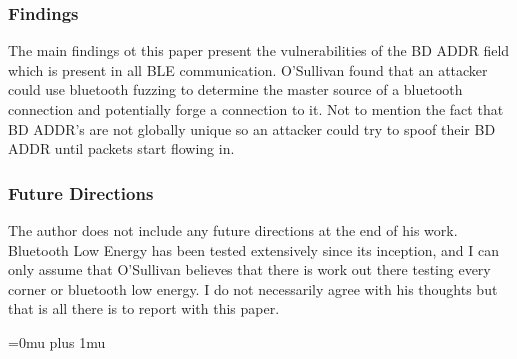 \subsubsection{Findings}

\noindent
The main findings ot this paper present the vulnerabilities of the BD ADDR field which is present in all BLE communication. O'Sullivan found that an attacker could use bluetooth fuzzing to determine the master source of a bluetooth connection and potentially forge a connection to it. Not to mention the fact that BD ADDR's are not globally unique so an attacker could try to spoof their BD ADDR until packets start flowing in.

\subsubsection{Future Directions}

\noindent
The author does not include any future directions at the end of his work. Bluetooth Low Energy has been tested extensively since its inception, and I can only assume that O'Sullivan believes that there is work out there testing every corner or bluetooth low energy. I do not necessarily agree with his thoughts but that is all there is to report with this paper.

\Urlmuskip=0mu plus 1mu\relax

\pagebreak